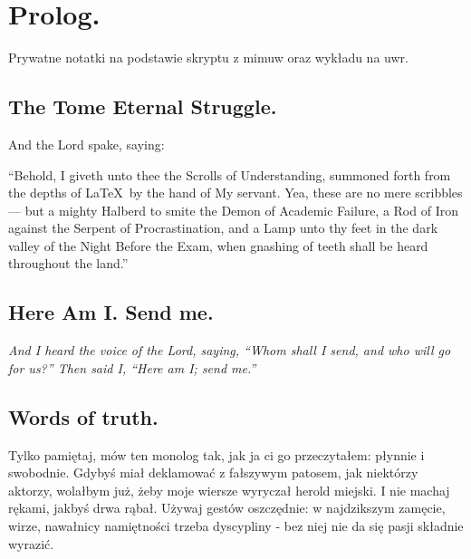 \chapter*{Prolog.}

Prywatne notatki na podstawie skryptu z mimuw oraz wykładu na uwr. 

\section*{The Tome Eternal Struggle.}

And the Lord spake, saying:

“Behold, I giveth unto thee the Scrolls of Understanding, summoned forth from the depths of \LaTeX\ by the hand of My servant. Yea, these are no mere scribbles — but a mighty Halberd to smite the Demon of Academic Failure, a Rod of Iron against the Serpent of Procrastination, and a Lamp unto thy feet in the dark valley of the Night Before the Exam, when gnashing of teeth shall be heard throughout the land.”

\section*{Here Am I. Send me.}
\textit{And I heard the voice of the Lord, saying,
“Whom shall I send, and who will go for us?”
Then said I, “Here am I; send me.”} 

\section*{Words of truth.}
Tylko pamiętaj, mów ten monolog tak, jak ja ci go przeczytałem: płynnie i swobodnie. Gdybyś miał deklamować z fałszywym patosem, jak niektórzy aktorzy, wolałbym już, żeby moje wiersze wyryczał herold miejski. I nie machaj rękami, jakbyś drwa rąbał. Używaj gestów oszczędnie: w najdzikszym zamęcie, wirze, nawałnicy namiętności trzeba dyscypliny - bez niej nie da się pasji składnie wyrazić.

